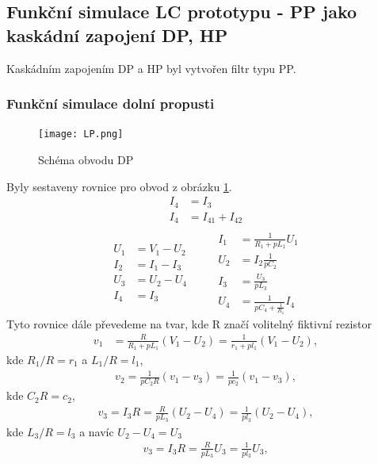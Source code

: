 \subsection{Funkční simulace LC prototypu - PP jako kaskádní zapojení DP, HP}
\noindent Kaskádním zapojením DP a HP byl vytvořen filtr typu PP.
\subsubsection{Funkční simulace dolní propusti}
\begin{figure}[h]
\centering
\texttt{[image: LP.png]}
\caption{Schéma obvodu DP \label{s:LP12}}
\end{figure}
Byly sestaveny rovnice pro obvod z obrázku \ref{s:LP12}.
\begin{align}
I_4 &= I_3\\
I_4 &= I_{41} + I_{42} \\
\end{align}
\begin{equation}
\begin{split}
U_1 &= V_1 - U_2 \\
I_2 &= I_1 - I_3 \\
U_3 &= U_2 - U_4\\
I_4 &= I_3
\end{split}
\quad \quad
\begin{split}
I_1 &= \frac{1}{R_1 + pL_1}U_1 \\
U_2 &= I_2\frac{1}{pC_2}\\
I_3 &= \frac{U_3}{pL_3}\\
U_4 &= \frac{1}{pC_4 + \frac{1}{R_z}}I_4
\end{split}
\end{equation}
Tyto rovnice dále převedeme na tvar, kde R značí volitelný fiktivní rezistor
\begin{align}
v_1 &= \frac{R}{R_1 + pL_1}(V_1 - U_2) = \frac{1}{r_1 + pl_1}(V_1 - U_2),
\end{align}
kde $R_1/R = r_1$ a $L_1/R = l_1$,
\begin{align}
v_2 = \frac{1}{pC_2R}(v_1 - v_3) = \frac{1}{pc_2}(v_1 - v_3),
\end{align}
kde $C_2R = c_2$,
\begin{align}
v_3 = I_3R = \frac{R}{pL_3}(U_2 - U_4) = \frac{1}{pl_3}(U_2 - U_4),
\end{align}
kde $L_3/R = l_3$ a navíc $U_2 - U_4 = U_3$
\begin{align}
v_3 = I_3R = \frac{R}{pL_3}U_3 = \frac{1}{pl_3}U_3,
\end{align}
